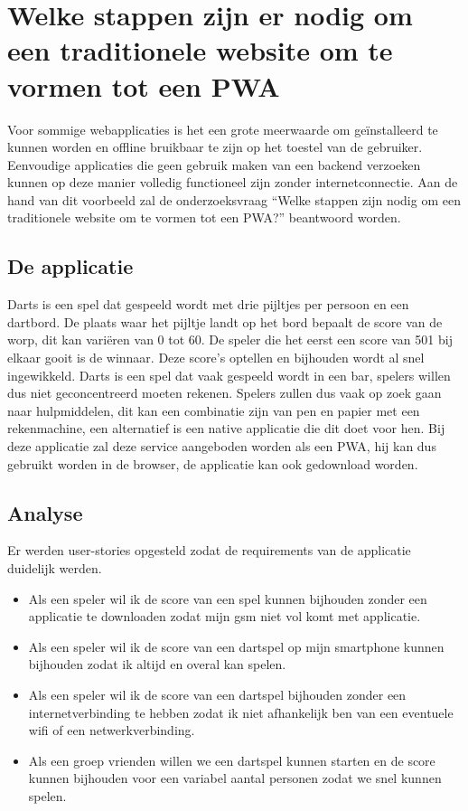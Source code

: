 \chapter{Welke stappen zijn er nodig om een traditionele website om te vormen tot een PWA}
\label{ch:TransformerenNaarEenPWA}



Voor sommige webapplicaties is het een grote meerwaarde om geïnstalleerd te kunnen worden  en offline bruikbaar te zijn op het toestel van de gebruiker.\autocite{Mozilla2020c} Eenvoudige applicaties die geen gebruik maken van een backend verzoeken kunnen op deze manier volledig functioneel zijn zonder internetconnectie. 
Aan de hand van dit voorbeeld zal de onderzoeksvraag “Welke stappen zijn nodig om een traditionele website om te vormen tot een PWA?” beantwoord worden.

\section{De applicatie}

	Darts is een spel dat gespeeld wordt met drie pijltjes per persoon en een dartbord. De plaats waar het pijltje landt op het bord bepaalt de score van de worp, dit kan variëren van 0 tot 60. De speler die het eerst een score van 501 bij elkaar gooit is de winnaar. Deze score’s optellen en bijhouden wordt al snel ingewikkeld. Darts is een spel dat vaak gespeeld wordt in een bar, spelers willen dus niet geconcentreerd moeten rekenen. Spelers zullen dus vaak op zoek gaan naar hulpmiddelen, dit kan een combinatie zijn van pen en papier met een rekenmachine, een alternatief is een native applicatie die dit doet voor hen. Bij deze applicatie zal deze service aangeboden worden als een PWA, hij kan dus gebruikt worden in de browser, de applicatie kan ook gedownload worden.

\section{Analyse}

	Er werden user-stories opgesteld zodat de requirements van de applicatie duidelijk werden.  
	
	\begin{itemize}
		 \item 	Als een speler wil ik de score van een spel kunnen bijhouden zonder een applicatie te downloaden zodat mijn gsm niet vol komt met applicatie.
		 \item 	Als een speler wil ik de score van een dartspel op mijn smartphone kunnen bijhouden zodat ik altijd en overal kan spelen.
		 \item 	Als een speler wil ik de score van een dartspel bijhouden zonder een internetverbinding te hebben zodat ik niet afhankelijk ben van een eventuele wifi of een netwerkverbinding.
		 \item 	Als een groep vrienden willen we een dartspel kunnen starten en de score kunnen bijhouden voor een variabel aantal personen zodat we snel kunnen spelen.
	\end{itemize}	


